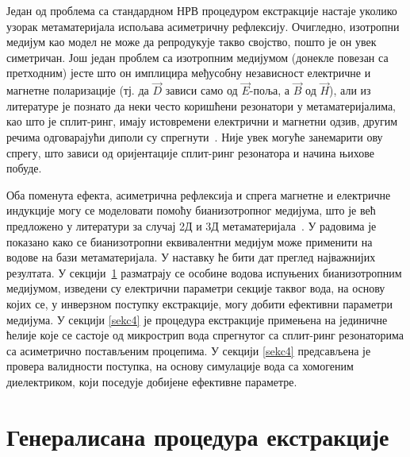 \documentclass[main.tex]{subfiles}
\begin{document}
Један од проблема са стандардном НРВ процедуром екстракције настаје уколико узорак метаматеријала испољава асиметричну рефлексију. Очигледно, изотропни медијум као модел не може да репродукује такво својство, пошто је он увек симетричан. Још један проблем са изотропним медијумом (донекле повезан са претходним) јесте што он имплицира међусобну независност електричне и магнетне поларизације (тј. да $\vec{D}$ зависи само од $\vec{E}$-поља, а $\vec{B}$ од $\vec{H}$), али из литературе је познато да неки често коришћени резонатори у метаматеријалима, као што је сплит-ринг, имају истовремени електрични и магнетни одзив, другим речима одговарајући диполи су спрегнути~\cite{marques}. Није увек могуће занемарити ову спрегу, што зависи од оријентације сплит-ринг резонатора и начина њихове побуде.

Оба поменута ефекта, асиметрична рефлексија и спрега магнетне и електричне индукције могу се моделовати помоћу бианизотропног медијума, што је већ предложено у литератури за случај 2Д и 3Д метаматеријала~\cite{chen:05,kriegler,shalaev}. У радовима \cite{bian_mtt,bian_physcr} је показано како се бианизотропни еквивалентни медијум може применити на водове на бази метаматеријала. У наставку ће бити дат преглед најважнијих резултата. У секцији~\ref{sekc2} разматрају се особине водова испуњених бианизотропним медијумом, изведени су електрични параметри секције таквог вода, на основу којих се, у инверзном поступку екстракције, могу добити ефективни параметри медијума. У секцији \ref{sekc4} је процедура екстракције примењена на јединичне ћелије које се састоје од микрострип вода спрегнутог са сплит-ринг резонаторима са асиметрично постављеним процепима. У секцији \ref{sekc4} предсављена је провера валидности поступка, на основу симулације вода са хомогеним диелектриком, који поседује добијене ефективне параметре.


\section{Генералисана процедура екстракције}\label{sekc2}
\end{document}
